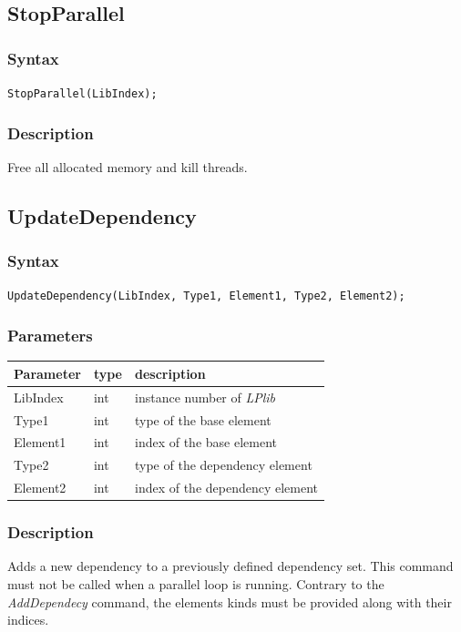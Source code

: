 \documentclass[a4paper,12pt]{article}
\begin{document}
\subsection{StopParallel}

\subsubsection*{Syntax}
\tt{StopParallel(LibIndex);}
\normalfont

\subsubsection*{Description}
Free all allocated memory and kill threads.


\subsection{UpdateDependency}

\subsubsection*{Syntax}
\tt{UpdateDependency(LibIndex, Type1, Element1, Type2, Element2);}
\normalfont

\subsubsection*{Parameters}

\begin{tabular}{|m{2cm}|m{1.5cm}|m{10.5cm}|}
\hline
Parameter  & type   & description \\
\hline
LibIndex   & int    & instance number of \emph{LPlib} \\
\hline
Type1      & int    & type of the base element \\
\hline
Element1   & int    & index of the base element \\
\hline
Type2      & int    & type of the dependency element \\
\hline
Element2   & int    & index of the dependency element \\
\hline
\end{tabular}

\subsubsection*{Description}
Adds a new dependency to a previously defined dependency set. This command must not be called when a parallel loop is running. Contrary to the \emph{AddDependecy} command, the elements kinds must be provided along with their indices.
\end{document}
